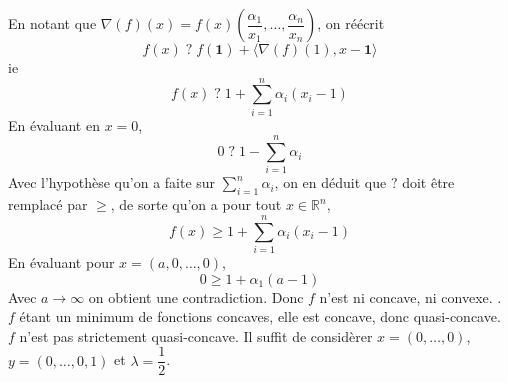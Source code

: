 \documentclass{fancybook}
\begin{document}
En notant que $\nabla(f)(x)=f(x)(\dfrac{\alpha_1}{x_1},\ldots,\dfrac{\alpha_n}{x_n})$, on réécrit
$$ f(x) \;?\; f(\mathbf 1) + \langle \nabla(f)(1),x- \mathbf 1\rangle$$
ie 
$$ f(x) \;?\; 1 + \sum_{i=1}^n \alpha_i(x_i-1)$$
 En évaluant en $x=0$, $$0 \;?\; 1 -\sum_{i=1}^n \alpha_i  $$
 Avec l'hypothèse qu'on a faite sur $\displaystyle \sum_{i=1}^n \alpha_i$, on en déduit que $?$ doit être remplacé par $\geq$, de sorte qu'on a pour tout $x\in \mathbb R^n$, $$f(x)\geq  1 + \sum_{i=1}^n \alpha_i(x_i-1)$$
 En évaluant pour $x=(a,0,\ldots,0)$, $$0\geq 1+\alpha_1(a-1)$$
 Avec $a\to \infty$ on obtient une contradiction. Donc $f$ n'est ni concave, ni convexe.
 \newline {}. $f$ étant un minimum de fonctions concaves, elle est concave, donc quasi-concave. \newline
$f$ n'est pas strictement quasi-concave. Il suffit de considèrer $x=(0,\ldots,0)$, $y=(0,\ldots,0,1)$ et $\lambda=\dfrac{1}{2}$.
\end{document}
